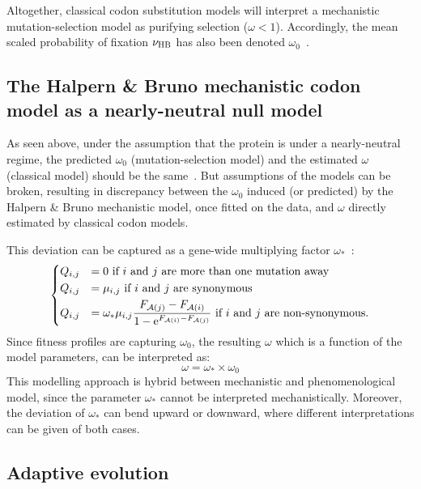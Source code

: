 Altogether, classical codon substitution models will interpret a mechanistic mutation-selection model as purifying selection ($\omega < 1$).
Accordingly, the mean scaled probability of fixation $\nu_{\text{HB}}$ has also been denoted $\omega_0$~\citep{Rodrigue2016}.

\subsection{The Halpern \& Bruno mechanistic codon model as a nearly-neutral null model}
\label{subsec:HB-formalism-nearly-neutral-null-model}

As seen above, under the assumption that the protein is under a nearly-neutral regime, the predicted $\omega_0$ (mutation-selection model) and the estimated $\omega$ (classical model) should be the same~\citep{Spielman2015}.
But assumptions of the models can be broken, resulting in discrepancy between the $\omega_0$ induced (or predicted) by the Halpern \& Bruno mechanistic model, once fitted on the data, and $\omega$ directly estimated by classical codon models.

This deviation can be captured as a gene-wide multiplying factor $\omega_*$~\citep{Rodrigue2016}:
\begin{equation}
    \begin{dcases}
        Q_{{i}, {j}} & = 0 \text{ if ${i}$ and ${j}$ are more than one mutation away} \\
        Q_{{i}, {j}} & = \mu_{{i}, {j}} \text{ if ${i}$ and ${j}$ are synonymous} \\
        Q_{{i}, {j}} & = \omega_* \mu_{{i}, {j}} \dfrac{F_{\mathcal{A}({j})} - F_{\mathcal{A}({i})}}{1 - \text{e}^{F_{\mathcal{A}({i})} - F_{\mathcal{A}({j})}} } \text{ if ${i}$ and ${j}$ are non-synonymous}.
    \end{dcases}
    \label{eq:propensities-models-omegastar}
\end{equation}
Since fitness profiles are capturing $\omega_0$, the resulting $\omega$ which is a function of the model parameters, can be interpreted as:
\begin{equation}
    \omega = \omega_* \times \omega_0
\end{equation}
This modelling approach is hybrid between mechanistic and phenomenological model, since the parameter $\omega_*$ cannot be interpreted mechanistically.
Moreover, the deviation of $\omega_*$ can bend upward or downward, where different interpretations can be given of both cases.

\subsection{Adaptive evolution}
\label{subsec:adaptive-evolution}

